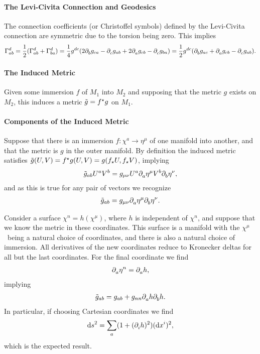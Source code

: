 \paragraph{The Levi-Civita Connection and Geodesics}
The connection coefficients (or Christoffel symbols) defined by the Levi-Civita connection are symmetric due to the torsion being zero. This implies
\begin{align*}
	\chris{d}{a}{b} = \frac{1}{2}(\chris{d}{a}{b} + \chris{d}{b}{a}) = \frac{1}{4}g^{dc}(2\del{}{b}{g_{ca}} - \del{}{c}{g_{ab}} + 2\del{}{a}{g_{cb}} - \del{}{c}{g_{ba}}) = \frac{1}{2}g^{dc}(\del{}{b}{g_{ac}} + \del{}{a}{g_{cb}} - \del{}{c}{g_{ab}}).
\end{align*}

\paragraph{The Induced Metric}
Given some immersion $f$ of $M_{1}$ into $M_{2}$ and supposing that the metric $g$ exists on $M_{2}$, this induces a metric $\tilde{g} = f^{\star}g$ on $M_{1}$.

\paragraph{Components of the Induced Metric}
Suppose that there is an immersion $f: \chi^{a}\to\eta^{\mu}$ of one manifold into another, and that the metric is $g$ in the outer manifold. By definition the induced metric satisfies $\tilde{g}(U, V) = f^{\star}g(U, V) = g(f_{\star}U, f_{\star}V)$, implying
\begin{align*}
	\tilde{g}_{ab}U^{a}V^{b} = g_{\mu\nu}U^{a}\partial^{}_{a}{\eta^{\mu}}V^{b}\partial^{}_{b}{\eta^{\nu}},
\end{align*}
and as this is true for any pair of vectors we recognize
\begin{align*}
	\tilde{g}_{ab} = g_{\mu\nu}\partial^{}_{a}{\eta^{\mu}}\partial^{}_{b}{\eta^{\nu}}.
\end{align*}

Consider a surface $\chi^{n} = h(\chi^{\mu})$, where $h$ is independent of $\chi^{n}$, and suppose that we know the metric in these coordinates. This surface is a manifold with the $\chi^{\mu}$ being a natural choice of coordinates, and there is also a natural choice of immersion. All derivatives of the new coordinates reduce to Kronecker deltas for all but the last coordinates. For the final coordinate we find
\begin{align*}
	\partial^{}_{a}{\eta^{n}} = \partial^{}_{a}{h},
\end{align*}
implying
\begin{align*}
	\tilde{g}_{ab} = g_{ab} + g_{nn}\partial^{}_{a}{h}\partial^{}_{b}{h}.
\end{align*}
In particular, if choosing Cartesian coordinates we find
\begin{align*}
	\dd{s}^{2} = \sum\limits_{a}(1 + (\partial^{}_{i}{h})^{2})(\dd{x}^{i})^{2},
\end{align*}
which is the expected result.

